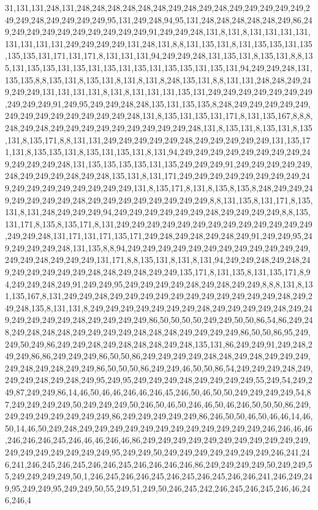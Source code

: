 31,131,131,248,131,248,248,248,248,248,248,249,248,249,248,249,249,249,249,249,249,249,248,249,249,249,249,95,131,249,248,94,95,131,248,248,248,248,248,249,86,249,249,249,249,249,249,249,249,249,249,91,249,249,248,131,8,131,8,131,131,131,131,131,131,131,131,249,249,249,249,131,248,131,8,8,131,135,131,8,131,135,135,131,135,135,135,131,171,131,171,8,131,131,131,94,249,249,248,131,135,131,8,135,131,8,8,135,131,135,135,131,135,131,135,131,135,131,135,135,131,135,131,94,249,249,248,131,135,135,8,8,135,131,8,135,131,8,131,8,131,8,248,135,131,8,8,131,131,248,248,249,249,249,249,131,131,131,131,8,131,8,131,131,131,135,131,249,249,249,249,249,249,249,249,249,249,91,249,95,249,249,248,248,135,131,135,135,8,248,249,249,249,249,249,249,249,249,249,249,249,249,249,248,131,8,135,131,135,131,171,8,131,135,167,8,8,8,248,249,248,249,249,249,249,249,249,249,249,249,248,131,8,135,131,8,135,131,8,135,131,8,135,171,8,8,131,131,249,249,249,249,249,248,249,249,249,249,249,131,135,171,131,8,135,135,131,8,135,131,135,131,8,131,94,249,249,249,249,249,249,249,249,249,249,249,249,248,131,135,135,135,135,131,135,249,249,249,91,249,249,249,249,249,248,249,249,249,248,249,248,135,131,8,131,171,249,249,249,249,249,249,249,249,249,249,249,249,249,249,249,249,249,131,8,135,171,8,131,8,135,8,135,8,248,249,249,249,249,249,249,249,248,249,249,249,249,249,249,249,249,8,8,131,135,8,131,171,8,135,131,8,131,248,249,249,249,94,249,249,249,249,249,249,248,249,249,249,249,8,8,135,131,171,8,135,8,135,171,8,131,249,249,249,249,249,249,249,249,249,249,249,249,249,249,249,248,131,171,131,171,135,171,249,248,249,248,249,248,249,91,249,249,95,249,249,249,249,248,131,135,8,8,94,249,249,249,249,249,249,249,249,249,249,249,249,249,249,248,249,249,249,131,171,8,8,135,131,8,131,8,131,94,249,249,248,249,248,249,249,249,249,249,249,248,248,249,248,249,249,135,171,8,131,135,8,131,135,171,8,94,249,249,248,249,91,249,249,95,249,249,249,249,248,249,248,249,249,8,8,8,131,8,131,135,167,8,131,249,249,248,249,249,249,249,249,249,249,249,249,249,249,248,249,249,248,135,8,131,131,8,249,249,249,249,249,249,249,248,249,249,249,249,248,249,249,249,249,249,249,248,249,249,249,249,86,50,50,50,50,249,249,50,50,86,54,86,249,248,249,248,248,248,249,249,249,249,248,248,248,249,249,249,249,86,50,50,86,95,249,249,50,249,86,249,249,248,249,248,248,248,249,248,135,131,86,249,249,91,249,248,249,249,86,86,249,249,249,86,50,50,86,249,249,249,249,248,248,249,248,249,249,249,249,248,249,248,249,249,86,50,50,50,86,249,249,46,50,50,86,54,249,249,249,248,249,249,249,248,249,248,249,95,249,95,249,249,249,248,249,249,249,249,55,249,54,249,249,87,249,249,86,14,46,50,46,46,246,46,246,45,246,50,46,50,50,249,249,249,249,54,87,249,249,249,249,50,249,249,249,50,246,50,46,50,246,46,50,46,246,50,50,50,86,249,249,249,249,249,249,249,249,86,249,249,249,249,249,86,246,50,50,46,50,46,46,14,46,50,14,46,50,249,248,249,249,249,249,249,249,249,249,249,249,249,249,246,246,46,46,246,246,246,245,246,46,46,246,46,86,249,249,249,249,249,249,249,249,249,249,249,249,249,249,249,249,249,249,95,249,249,50,249,249,249,249,249,249,249,246,241,246,241,246,245,246,245,246,246,245,246,246,246,246,86,249,249,249,249,50,249,249,55,249,249,249,249,50,1,246,245,246,246,245,246,245,246,245,246,246,241,246,249,249,95,249,249,95,249,249,50,55,249,51,249,50,246,245,242,246,245,246,245,246,46,246,246,4